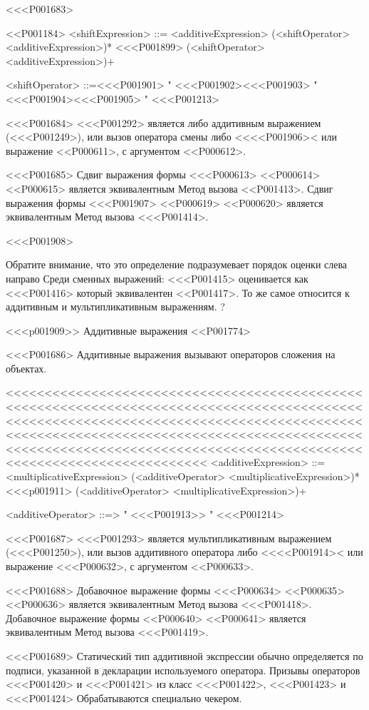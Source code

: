 {{{{{{{{{{{{{{{{{{{<<<P001683>%

<<P001184>
<shiftExpression> ::= \gnewline{}
<additiveExpression> (<shiftOperator> <additiveExpression>)*
<<<P001899> \SUPER{} (<shiftOperator> <additiveExpression>)+

<shiftOperator> ::=<<<P001901> "
<<<P001902><<<P001903> "
<<<P001904><<<P001905> "
<<<P001213>

<<<P001684>%
<<<P001292> является либо аддитивным выражением
(<<<P001249>),
или вызов оператора смены
либо <<<<P001906>< или выражение <<P000611>,
с аргументом <<P000612>.

<<<P001685>%
Сдвиг выражения формы <<<P000613> <<P000614> <<P000615> является эквивалентным
Метод вызова <<P001413>.
Сдвиг выражения формы <<<P001907> <<P000619> <<P000620> является эквивалентным
Метод вызова <<<P001414>.

<<<P001908>{%
Обратите внимание, что это определение подразумевает порядок оценки слева направо
Среди сменных выражений:
<<<P001415>
оценивается как
<<<P001416> который эквивалентен
<<P001417>.
То же самое относится к аддитивным и мультипликативным выражениям.
?


<<<p001909>> Аддитивные выражения
<<P001774>

<<<P001686>%
Аддитивные выражения вызывают операторов сложения на объектах.

<<<<<<<<<<<<<<<<<<<<<<<<<<<<<<<<<<<<<<<<<<<<<<<<<<<<<<<<<<<<<<<<<<<<<<<<<<<<<<<<<<<<<<<<<<<<<<<<<<<<<<<<<<<<<<<<<<<<<<<<<<<<<<<<<<<<<<<<<<<<<<<<<<<<<<<<<<<<<<<<<<<<<<<<<<<<<<<<<<<<<<<<<<<<<<<<<<<<<<<<<<<<<<<<<<<<<<<<<<<<<<<<<<<<<<<<<<<<<<<<<<<<<<<<<<<<<<<<
<additiveExpression> ::= <multiplicativeExpression>
\gnewline{} (<additiveOperator> <multiplicativeExpression>)*
<<<p001911> \SUPER{} (<additiveOperator> <multiplicativeExpression>)+

<additiveOperator> ::=> "
<<<P001913>> "
<<<P001214>

<<<P001687>%
<<<P001293> является мультипликативным выражением
(<<<P001250>),
или вызов аддитивного оператора
либо <<<<P001914>< или выражение <<<P000632>,
с аргументом <<P000633>.

<<<P001688>%
Добавочное выражение формы <<<P000634> <<P000635><<P000636> является эквивалентным
Метод вызова <<<P001418>.
Добавочное выражение формы \SUPER{} <<P000640> <<P000641> является эквивалентным
Метод вызова <<<P001419>.

<<<P001689>%
Статический тип аддитивной экспрессии обычно определяется
по подписи, указанной в декларации используемого оператора.
Призывы операторов <<<P001420> и <<<P001421> из
класс <<<P001422>, <<<P001423> и <<<P001424>
Обрабатываются специально чекером.

}}}}}}}}}}}}}}}}}}}}
